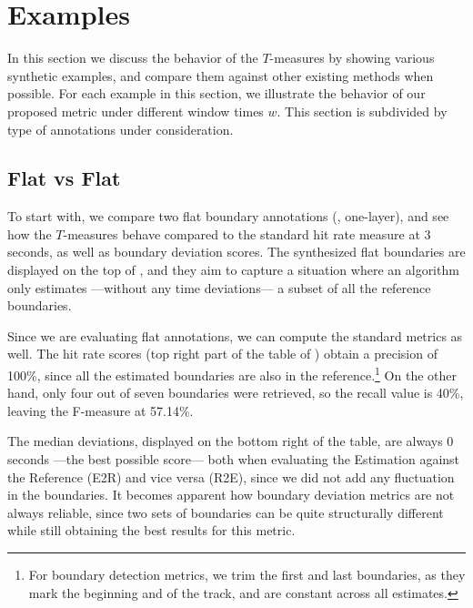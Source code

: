 \documentclass{article}
\begin{document}
\section{Examples}\label{sec:examples}

In this section we discuss the behavior of the $T$-measures by showing various synthetic examples, and compare them against other existing methods when possible.
For each example in this section, we illustrate the behavior of our proposed metric under different window times $w$.
This section is subdivided by type of annotations under consideration.

\subsection{Flat vs Flat}

To start with, we compare two flat boundary annotations (\ie, one-layer), and see how the $T$-measures behave compared to the standard hit rate measure at 3 seconds, as well as boundary deviation scores.
The synthesized flat boundaries are displayed on the top of , and they aim to capture a situation where an algorithm only estimates ---without any time deviations--- a subset of all the reference boundaries.

Since we are evaluating flat annotations, we can compute the standard metrics as well.
The hit rate scores (top right part of the table of ) obtain a precision of 100\%, since all the estimated boundaries are also in the reference.\footnote{For boundary detection metrics, we trim the first and last boundaries, as they mark the beginning and of the track, and are constant across all estimates.}
On the other hand, only four out of seven boundaries were retrieved, so the recall value is 40\%, leaving the F-measure at 57.14\%.

The median deviations, displayed on the bottom right of the table, are always 0 seconds ---the best possible score--- both when evaluating the Estimation against the Reference (E2R) and vice versa (R2E), since we did not add any fluctuation in the boundaries.
It becomes apparent how boundary deviation metrics are not always reliable, since two sets of boundaries can be quite structurally different while still obtaining the best results for this metric.
\end{document}

